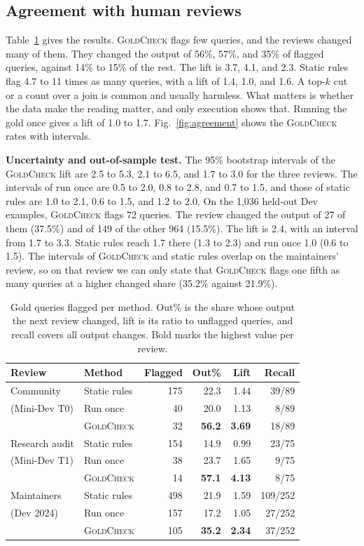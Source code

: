 \documentclass[conference]{IEEEtran}
\newcommand{\sys}{\textsc{GoldCheck}}
\begin{document}
\subsection{Agreement with human reviews}
Table~\ref{tab:baselines} gives the results. \sys{} flags few queries, and the
reviews changed many of them. They changed the output of 56\%, 57\%, and 35\% of
flagged queries, against 14\% to 15\% of the rest. The lift is 3.7, 4.1, and
2.3. Static rules flag 4.7 to 11 times as many queries, with a lift of 1.4, 1.0,
and 1.6. A top-$k$ cut or a count over a join is common and usually harmless.
What matters is whether the data make the reading matter, and only execution
shows that. Running the gold once gives a lift of 1.0 to 1.7. Fig.~\ref{fig:agreement}
shows the \sys{} rates with intervals.

\textbf{Uncertainty and out-of-sample test.} The 95\% bootstrap intervals of
the \sys{} lift are 2.5 to 5.3, 2.1 to 6.5, and 1.7 to 3.0 for the three
reviews. The intervals of run once are 0.5 to 2.0, 0.8 to 2.8, and 0.7 to 1.5,
and those of static rules are 1.0 to 2.1, 0.6 to 1.5, and 1.2 to 2.0. On the
1,036 held-out Dev examples, \sys{} flags 72 queries. The review changed the
output of 27 of them (37.5\%) and of 149 of the other 964 (15.5\%). The lift is
2.4, with an interval from 1.7 to 3.3. Static rules reach 1.7 there (1.3 to 2.3)
and run once 1.0 (0.6 to 1.5). The intervals of \sys{} and static rules overlap
on the maintainers' review, so on that review we can only state that \sys{}
flags one fifth as many queries at a higher changed share (35.2\% against
21.9\%).

\begin{table}[t]
\caption{Gold queries flagged per method. Out\% is the share whose output the
next review changed, lift is its ratio to unflagged queries, and recall covers
all output changes. Bold marks the highest value per review.}
\label{tab:baselines}
\centering
\footnotesize
\setlength{\tabcolsep}{3.2pt}
\begin{tabular}{@{}llrrrr@{}}
\toprule
Review & Method & Flagged & Out\% & Lift & Recall \\
\midrule
Community & Static rules & 175 & 22.3 & 1.44 & 39/89 \\
(Mini-Dev T0) & Run once & 40 & 20.0 & 1.13 & 8/89 \\
 & \sys{} & 32 & \textbf{56.2} & \textbf{3.69} & 18/89 \\
\midrule
Research audit & Static rules & 154 & 14.9 & 0.99 & 23/75 \\
(Mini-Dev T1) & Run once & 38 & 23.7 & 1.65 & 9/75 \\
 & \sys{} & 14 & \textbf{57.1} & \textbf{4.13} & 8/75 \\
\midrule
Maintainers & Static rules & 498 & 21.9 & 1.59 & 109/252 \\
(Dev 2024) & Run once & 157 & 17.2 & 1.05 & 27/252 \\
 & \sys{} & 105 & \textbf{35.2} & \textbf{2.34} & 37/252 \\
\bottomrule
\end{tabular}
\end{table}
\end{document}

